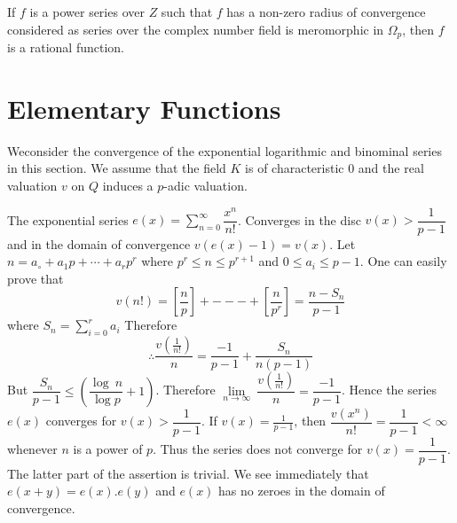 \begin{coro*}
  If $f$ is a power series over $Z$ such that $f$ has a non-zero
  radius of convergence considered as series over the complex number
  field is meromorphic in $\Omega_{p}$, then $f$ is a rational
  function.  
\end{coro*}

\section{Elementary Functions}\label{part3:chap1:sec4}

We\pageoriginale consider the convergence of the exponential logarithmic and
binominal series in this section. We assume that the field $K$ is of
characteristic $0$ and the real valuation $v$ on $Q$ induces a
$p$-adic valuation.  

The exponential series
$e(x)=\sum\limits^{\infty}_{n=0}\dfrac{x^n}{n!}$. Converges in the
disc $v(x)>\dfrac{1}{p-1}$ and in the domain of convergence
$v(e(x)-1)=v(x)$. Let $n=a_\circ+a_1p+\cdots+a_r p^r$ where $p^r\leq n
\leq p^{r+1}$ and $0\leq a_i \leq p-1$. One can easily prove that  
$$
v(n!)=\left[\frac{n}{p}\right] +---+ \left[\frac{n}{p^r}\right]
=\frac{n-S_n}{p-1} 
$$
where $S_n=\sum\limits^r_{i=0}a_i$
Therefore 
$$
\therefore{\dfrac{v(\frac{1}{n!})}{n}} = \frac{-1}{p-1}+\frac{S_n}{n(p-1)}
$$
But $\dfrac{S_n}{p-1}\leq\left(\dfrac{\log ~n}{\log p}+1\right)$. Therefore
$\lim\limits_{n\to\infty} ~\dfrac{v\left(\frac{1}{n!}\right)}{n}
=\dfrac{-1}{p-1}$.  
Hence the series $e(x)$ converges for $v(x) > \dfrac{1}{p-1}$. If
$v(x)=\frac{1}{p-1}$, then
$\dfrac{v(x^n)}{n!}=\dfrac{1}{p-1}<\infty$ whenever $n$ is a power of
$p$. Thus the series does not converge for $v(x)=\dfrac{1}{p-1}$. The
latter part of the assertion is trivial. We see immediately that
$e(x+y)=e(x).e(y)$ and $e(x)$ has no zeroes in the domain of convergence.  

